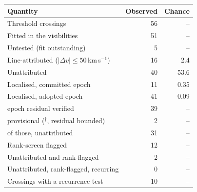 \begin{tabular}{@{}lrr@{}}
\hline
Quantity & Observed & Chance \\
\hline
Threshold crossings & 56 & -- \\
Fitted in the visibilities & 51 & -- \\
Untested (fit outstanding) & 5 & -- \\
Line-attributed ($|\Delta v|\leq50$\,km\,s$^{-1}$) & 16 & 2.4 \\
Unattributed & 40 & 53.6 \\
Localised, committed epoch & 11 & 0.35 \\
Localised, adopted epoch & 41 & 0.09 \\
\quad epoch residual verified & 39 & -- \\
\quad provisional ($^{\dagger}$, residual bounded) & 2 & -- \\
\quad of those, unattributed & 31 & -- \\
Rank-screen flagged & 12 & -- \\
Unattributed and rank-flagged & 2 & -- \\
Unattributed, rank-flagged, recurring & 0 & -- \\
Crossings with a recurrence test & 10 & -- \\
\hline
\end{tabular}
